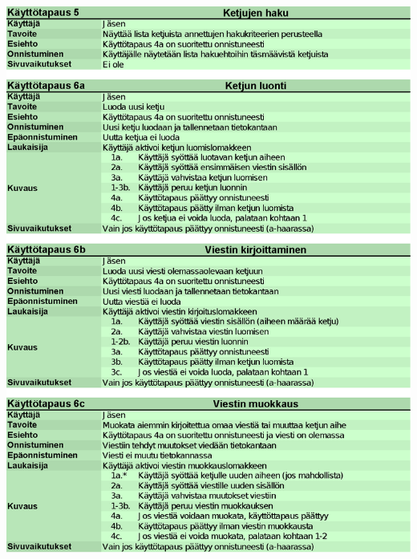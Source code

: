 \documentclass[11pt]{article}
\begin{document}
		\includegraphics[trim = 21mm 0mm 0mm 25mm]{kayttotapausmalli-sivu-2.eps}\\
\end{document}
